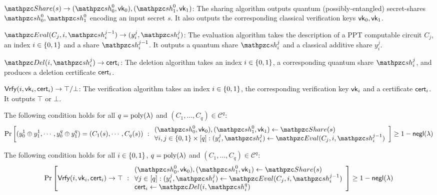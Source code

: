 \begin{description}

\item [Syntax:] $ $
\item $\Sh(s) \rightarrow (\qsh_0^0, \vk_0), (\qsh_1^0,
\vk_1)$: The sharing algorithm outputs quantum
(possibly-entangled) secret-shares $\qsh_0^0, \qsh_1^0$ encoding an
input secret $s$. It also outputs the corresponding classical
verification keys $\mathsf{vk}_0, \mathsf{vk}_1$.

\item $\Ev(C_j, i, \qsh_i^{j-1}) \rightarrow (y_i^j, \qsh_i^{j})$:
The
evaluation algorithm takes the description of a PPT computable
circuit $C_j$, an index $i \in \{0,1\}$ and a share
$\qsh_i^{j-1}$. It outputs a quantum share $\qsh_i^j$ and a
classical additive share $y_i^j$.

\item $\Del(i, \qsh_i^j) \rightarrow \cert_i$: The deletion
algorithm takes an index $i \in \{0,1\}$, a corresponding quantum share
$\qsh_i^j$, and produces a deletion certificate $\mathsf{cert}_i$.

\item $\mathsf{Vrfy}(i, \mathsf{vk}_i, \mathsf{cert}_i) \rightarrow \top/\bot$: The
verification algorithm takes an index $i \in \{0,1\}$, the
corresponding verification key $\mathsf{vk}_i$ and a certificate $\mathsf{cert}_i$.
It outputs $\top$ or $\bot$.

\item [Evaluation Correctness:] The following
condition holds for all $q = {\mathrm{poly}}(\lambda)$ and $(C_1, \ldots, C_q)
\in \mathcal{C}^q$:
\begin{align}
\Pr\left[
(y_0^1 \xor y_1^1, \cdots, y_0^q \xor y_1^q) = (C_1(s), \cdots,
C_q(s))
\ :
\begin{array}{ll}
(\qsh_0^0, \vk_0), (\qsh_1^0, \vk_1) \gets \Sh(s)\\
\forall i,j \in \bit \times [q]: (y_i^j, \qsh_i^j)
\leftarrow \Ev(C_j, i,
\qsh_i^{j-1})
\end{array}
\right] \geq 1 - \negl(\secp)
\end{align}

\item [Deletion Correctness:] The following condition holds for
all $i \in \{0,1\}$, $q = {\mathrm{poly}}(\lambda)$ and $(C_1, \ldots, C_q) \in
\mathcal{C}^q:$
\begin{align}
\Pr\left[
\Vrfy(i, \vk_i, \cert_i) \rightarrow \top
\ :
\begin{array}{ll}
(\qsh_0^0, \vk_0), (\qsh_1^0, \vk_1) \gets \Sh(s)\\
\forall j \in [q]: (y_i^j, \qsh_i^j) \leftarrow \Ev(C_j, i,
\qsh_i^{j-1})\\
\cert_i \leftarrow \Del(i, \qsh_i^q)
\end{array}
\right] \geq 1 - \negl(\secp)
\end{align}
\end{description}

